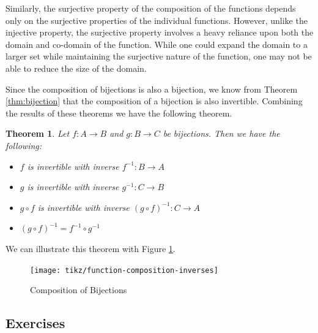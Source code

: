 \documentclass[
]{book}
\newtheorem{theorem}{Theorem}[chapter]
\theoremstyle{definition}
\theoremstyle{definition}
\theoremstyle{definition}
\theoremstyle{definition}
\theoremstyle{remark}
\begin{document}
Similarly, the surjective property of the composition of the functions depends only on the surjective properties of the individual functions. However, unlike the injective property, the surjective property involves a heavy reliance upon both the domain and co-domain of the function. While one could expand the domain to a larger set while maintaining the surjective nature of the function, one may not be able to reduce the size of the domain.

Since the composition of bijections is also a bijection, we know from Theorem \ref{thm:bijection} that the composition of a bijection is also invertible. Combining the results of these theorems we have the following theorem.

\begin{theorem}

Let \(f:A\rightarrow B\) and \(g:B\rightarrow C\) be bijections. Then we have the following:

\begin{itemize}
\item
  \(f\) is invertible with inverse \(f^{-1}:B\rightarrow A\)
\item
  \(g\) is invertible with inverse \(g^{-1}:C\rightarrow B\)
\item
  \(g\circ f\) is invertible with inverse \((g\circ f)^{-1}:C\rightarrow A\)
\item
  \((g\circ f)^{-1} = f^{-1} \circ g^{-1}\)
\end{itemize}

\end{theorem}

We can illustrate this theorem with Figure \ref{fig:composition-bijections}.

\begin{figure}

{\centering \texttt{[image: tikz/function-composition-inverses]} 

}

\caption{Composition of Bijections}\label{fig:composition-bijections}
\end{figure}

\hypertarget{exercises-19}{%
\subsection{Exercises}\label{exercises-19}}
\end{document}

